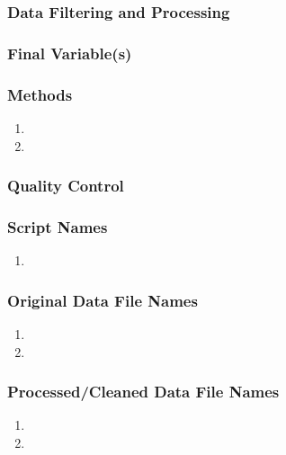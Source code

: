 \subsubsection*{Data Filtering and Processing}

\subsubsection*{Final Variable(s)}

\subsubsection*{Methods}

\begin{enumerate}
\item 
\item
\end{enumerate}

\subsubsection*{Quality Control}

\subsubsection*{Script Names}

\begin{enumerate}
\item 
\end{enumerate}

\subsubsection*{Original Data File Names}

\begin{enumerate}
\item 
\item 
\end{enumerate}

\subsubsection*{Processed/Cleaned Data File Names}

\begin{enumerate}
\item 
\item 
\end{enumerate}
